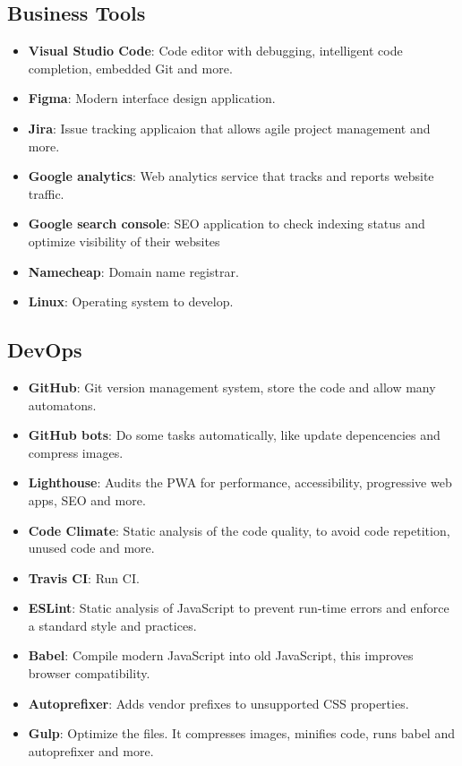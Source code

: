 \subsection*{Business Tools}
\begin{multicols}{2}
\begin{itemize}[noitemsep]
    \item \textbf{Visual Studio Code}: Code editor with debugging, intelligent code completion, embedded Git and more.
    \item \textbf{Figma}: Modern interface design application.
    \item \textbf{Jira}: Issue tracking applicaion  that allows agile project management and more.
    \item \textbf{Google analytics}: Web analytics service that tracks and reports website traffic. 
    \item \textbf{Google search console}: SEO application to check indexing status and optimize visibility of their websites
    \item \textbf{Namecheap}: Domain name registrar.
    \item \textbf{Linux}: Operating system to develop.
\end{itemize}
\end{multicols}

\subsection*{DevOps}
\begin{multicols}{2}
\begin{itemize}[noitemsep]
    \item \textbf{GitHub}: Git version management system, store the code and allow many automatons. 
    \item \textbf{GitHub bots}: Do some tasks automatically, like update depencencies and compress images.
    \item \textbf{Lighthouse}: Audits the PWA for performance, accessibility, progressive web apps, SEO and more.
    \item \textbf{Code Climate}: Static analysis of the code quality, to avoid code repetition, unused code and more.
    \item \textbf{Travis CI}: Run CI.
    \item \textbf{ESLint}: Static analysis of JavaScript to prevent run-time errors and enforce a standard style and practices.
    \item \textbf{Babel}: Compile modern JavaScript into old JavaScript, this improves browser compatibility.
    \item \textbf{Autoprefixer}: Adds vendor prefixes to unsupported CSS properties.
    \item \textbf{Gulp}: Optimize the files. It compresses images, minifies code, runs babel and autoprefixer and more.
\end{itemize}
\end{multicols}

